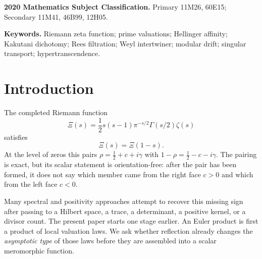 \documentclass[11pt]{article}
\theoremstyle{definition}
\theoremstyle{remark}
\begin{document}
\begin{abstract}
The abstract theorem now applies: no finite-Rees-moderate operator can sew an off-line reflected
pair, and every exact sewing has an essential scale singularity.  Standard Weyl reflection
escapes only by modular retuning; divisor differentiation escapes only through a singular graded
correspondence.  For the completed zeta current, finite-aperture transport is already four-unit
nonexpansive, while the RH-complete condition is exactly the corresponding zero-aperture
Ward-tangent bound.  These unconditional results do not prove the Riemann hypothesis.  They
identify a previously missing pre-divisor invariant and reduce the viable source-internal route
to transport of this valuation type through a singular boundary tangent.
\end{abstract}

\medskip
\noindent\textbf{2020 Mathematics Subject Classification.}
Primary 11M26, 60E15; Secondary 11M41, 46B99, 12H05.

\noindent\textbf{Keywords.}
Riemann zeta function; prime valuations; Hellinger affinity; Kakutani dichotomy;
Rees filtration; Weyl intertwiner; modular drift; singular transport; hypertranscendence.

\section{Introduction}\label{sec:introduction}

The completed Riemann function
\[
 \Xi(s)=\frac12s(s-1)\pi^{-s/2}\Gamma(s/2)\zeta(s)
\]
satisfies
\[
 \Xi(s)=\Xi(1-s).
 \tag{1.1}\label{eq:functional-equation}
\]
At the level of zeros this pairs
\(\rho=\tfrac12+c+i\gamma\) with \(1-\rho=\tfrac12-c-i\gamma\).  The pairing is exact,
but its scalar statement is orientation-free: after the pair has been formed, it does not say
which member came from the right face \(c>0\) and which from the left face \(c<0\).

Many spectral and positivity approaches attempt to recover this missing sign after passing to a
Hilbert space, a trace, a determinant, a positive kernel, or a divisor count.  The present paper
starts one stage earlier.  An Euler product is first a product of local valuation laws.  We ask
whether reflection already changes the \emph{asymptotic type} of those laws before they are
assembled into a scalar meromorphic function.
\end{document}
